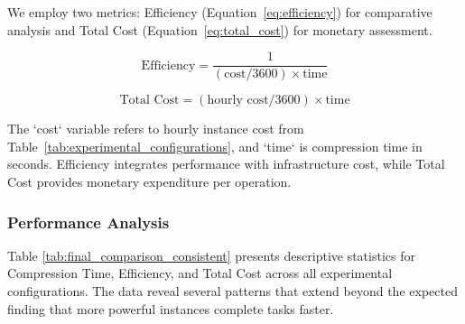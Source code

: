 \documentclass[conference]{IEEEtran}
\begin{document}
	We employ two metrics: Efficiency (Equation~\ref{eq:efficiency}) for comparative analysis and Total Cost (Equation~\ref{eq:total_cost}) for monetary assessment.
	
	\begin{equation}
		\text{Efficiency} = \frac{1}{(\text{cost}/3600) \times \text{time}}
		\label{eq:efficiency}
	\end{equation}
	
	\begin{equation}
		\text{Total Cost} = (\text{hourly cost}/3600) \times \text{time}
		\label{eq:total_cost}
	\end{equation}
	
	The `cost` variable refers to hourly instance cost from Table~\ref{tab:experimental_configurations}, and `time` is compression time in seconds. Efficiency integrates performance with infrastructure cost, while Total Cost provides monetary expenditure per operation.
	
	\subsubsection{Performance Analysis}
	
	Table \ref{tab:final_comparison_consistent} presents descriptive statistics for Compression Time, Efficiency, and Total Cost across all experimental configurations. The data reveal several patterns that extend beyond the expected finding that more powerful instances complete tasks faster.
	
\end{document}
